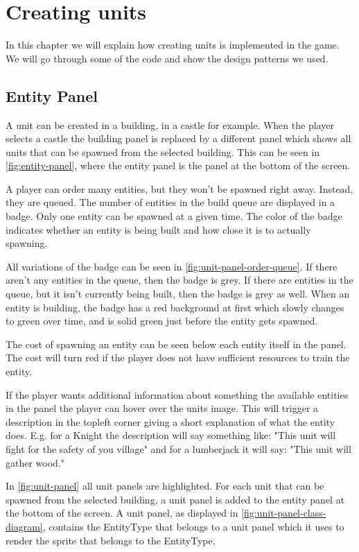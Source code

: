 \section{Creating units}
In this chapter we will explain how creating units is implemented in the game. We will go through some of the code and show the design patterns we used.

\subsection{Entity Panel} \label{EntityPanel}
A unit can be created in a building, in a castle for example. When the player selects a castle the building panel is replaced by a different panel which shows all units that can be spawned from the selected building. This can be seen in \cref{fig:entity-panel}, where the entity panel is the panel at the bottom of the screen. 

A player can order many entities, but they won't be spawned right away. Instead, they are queued. The number of entities in the build queue are displayed in a badge. Only one entity can be spawned at a given time. The color of the badge indicates whether an entity is being built and how close it is to actually spawning. 

All variations of the badge can be seen in \cref{fig:unit-panel-order-queue}. If there aren't any entities in the queue, then the badge is grey. If there are entities in the queue, but it isn't currently being built, then the badge is grey as well. When an entity is building, the badge has a red background at first which slowly changes to green over time, and is solid green just before the entity gets spawned.

The cost of spawning an entity can be seen below each entity itself in the panel. The cost will turn red if the player does not have sufficient resources to train the entity. 

If the player wants additional information about something the available entities in the panel the player can hover over the units image. This will trigger a description in the topleft corner giving a short explanation of what the entity does. E.g. for a Knight the description will say something like: "This unit will fight for the safety of you village" and for a lumberjack it will say: "This unit will gather wood."

In \cref{fig:unit-panel} all unit panels are highlighted. For each unit that can be spawned from the selected building, a unit panel is added to the entity panel at the bottom of the screen. A unit panel, as displayed in \cref{fig:unit-panel-class-diagram}, contains the EntityType that belongs to a unit panel which it uses to render the sprite that belongs to the EntityType.

